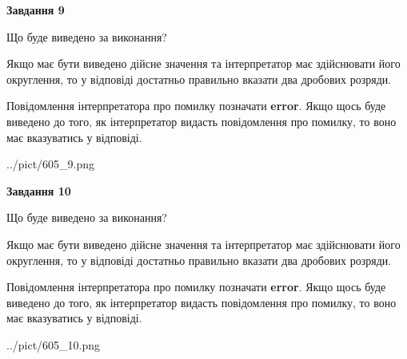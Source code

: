 \documentclass[12pt, ukrainian]{article}
\begin{document}
{\begin {Large}
{\begin {center}\textbf{Завдання 9}\end {center}}\par
Що буде виведено за виконання? \par

Якщо має бути виведено дійсне значення та інтерпретатор має здійснювати його округлення, 
то у відповіді достатньо правильно вказати два дробових розряди.

Повідомлення інтерпретатора про помилку позначати \textbf{error}.
Якщо щось буде виведено до того, як інтерпретатор видасть повідомлення про помилку, 
то воно має вказуватись у відповіді. \par

\begin{center}
	{../pict/605_9.png}
\end{center}
\newpage

{\begin {center}\textbf{Завдання 10}\end {center}}\par
Що буде виведено за виконання? \par

Якщо має бути виведено дійсне значення та інтерпретатор має здійснювати його округлення, 
то у відповіді достатньо правильно вказати два дробових розряди.

Повідомлення інтерпретатора про помилку позначати \textbf{error}.
Якщо щось буде виведено до того, як інтерпретатор видасть повідомлення про помилку, 
то воно має вказуватись у відповіді. \par

\begin{center}
	{../pict/605_10.png}
\end{center}
\newpage

\end {Large}}
\end{document}
